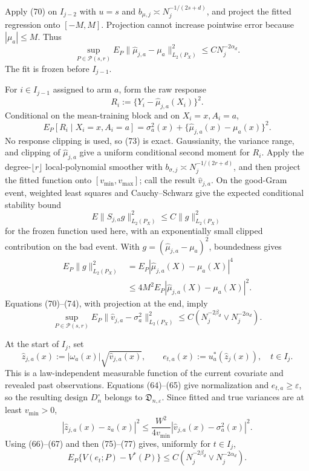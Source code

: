 Apply (70) on \(I_{j-2}\) with \(u=s\) and \(b_{\mu,j}\asymp N_j^{-1/(2s+d)}\), and project the fitted regression onto \([-M,M]\). Projection cannot increase pointwise error because \(|\mu_a|\leq M\). Thus
\[
\sup_{P\in\mathcal P(s,r)}
E_P\|\widehat\mu_{j,a}-\mu_a\|_{L_2(P_X)}^2
\leq C N_j^{-2\alpha_d}.
\tag{71}
\]
The fit is frozen before \(I_{j-1}\).

For \(i\in I_{j-1}\) assigned to arm \(a\), form the raw response
\[
R_i:=\{Y_i-\widehat\mu_{j,a}(X_i)\}^2.
\tag{72}
\]
Conditional on the mean-training block and on \(X_i=x,A_i=a\),
\[
E_P[R_i\mid X_i=x,A_i=a]
=\sigma_a^2(x)+\{\widehat\mu_{j,a}(x)-\mu_a(x)\}^2.
\tag{73}
\]
No response clipping is used, so (73) is exact. Gaussianity, the variance range, and clipping of \(\widehat\mu_{j,a}\) give a uniform conditional second moment for \(R_i\). Apply the degree-\(\lfloor r\rfloor\) local-polynomial smoother with \(b_{\sigma,j}\asymp N_j^{-1/(2r+d)}\), and then project the fitted function onto \([v_{\min},v_{\max}]\); call the result \(\widehat v_{j,a}\). On the good-Gram event, weighted least squares and Cauchy--Schwarz give the expected conditional stability bound
\[
E\|S_{j,a}g\|_{L_2(P_X)}^2
\leq C\|g\|_{L_2(P_X)}^2
\]
for the frozen function used here, with an exponentially small clipped contribution on the bad event. With \(g=(\widehat\mu_{j,a}-\mu_a)^2\), boundedness gives
\[
\begin{aligned}
E_P\|g\|_{L_2(P_X)}^2
&=E_P|\widehat\mu_{j,a}(X)-\mu_a(X)|^4\\
&\leq4M^2E_P|\widehat\mu_{j,a}(X)-\mu_a(X)|^2.
\end{aligned}
\tag{74}
\]
Equations (70)--(74), with projection at the end, imply
\[
\sup_{P\in\mathcal P(s,r)}
E_P\|\widehat v_{j,a}-\sigma_a^2\|_{L_2(P_X)}^2
\leq C\left(N_j^{-2\beta_d}\vee N_j^{-2\alpha_d}\right).
\tag{75}
\]

At the start of \(I_j\), set
\[
\widehat z_{j,a}(x):=|\omega_a(x)|\sqrt{\widehat v_{j,a}(x)},
\qquad
e_{t,a}(x):=u_a^*(\widehat z_j(x)),
\quad t\in I_j.
\tag{76}
\]
This is a law-independent measurable function of the current covariate and revealed past observations. Equations (64)--(65) give normalization and \(e_{t,a}\geq\varepsilon\), so the resulting design \(D_n^{\circ}\) belongs to \(\mathfrak D_{n,\varepsilon}\). Since fitted and true variances are at least \(v_{\min}>0\),
\[
|\widehat z_{j,a}(x)-z_a(x)|^2
\leq\frac{W^2}{4v_{\min}}
|\widehat v_{j,a}(x)-\sigma_a^2(x)|^2.
\tag{77}
\]
Using (66)--(67) and then (75)--(77) gives, uniformly for \(t\in I_j\),
\[
E_P\{V(e_t;P)-V^*(P)\}
\leq C\left(N_j^{-2\beta_d}\vee N_j^{-2\alpha_d}\right).
\tag{78}
\]

